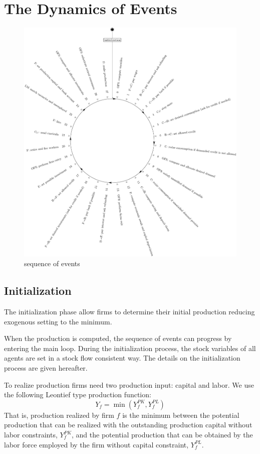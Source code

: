 \documentclass{book}
\begin{document}
\newpage
\chapter{The Dynamics of Events}\label{chap:events}

\begin{figure}[htp]
	\centering
\includegraphics[scale=0.5]{visual.pdf}
	\caption{sequence of events}
	\label{fig:sequence}
\end{figure}

\section{Initialization}
The initialization phase allow firms to determine their initial production reducing exogenous setting to the minimum. 

When the production is computed, the sequence of events can progress by entering the main loop. During the initialization process, the stock variables of all agents are set in a stock flow consistent way.
The details on the initialization process are given hereafter.

To realize production firms need two production input: capital and labor. We use the following Leontief type production function:
\[
Y_f=\min(Y_f^{PK},Y_f^{PL})
\]
That is, production realized by firm $f$ is the minimum between the potential production that can be realized with the outstanding production capital without labor constraints, $Y_f^{PK}$, and the potential production that can be obtained by the labor force employed by the firm without capital constraint, $Y_f^{PL}$. 
\end{document}
